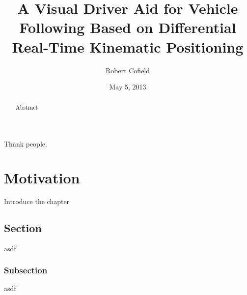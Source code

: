 \documentclass[12pt]{report}
\title{A Visual Driver Aid for Vehicle Following Based on Differential Real-Time Kinematic Positioning}
\author{Robert Cofield}
\date{May 5, 2013}
\begin{document}
\begin{romanpages}

\TitlePage

\begin{abstract}
Abstract
\end{abstract}

\begin{acknowledgments}
Thank people.
\end{acknowledgments}

\tableofcontents
\listoffigures
\listoftables

\printnomenclature[0.5in] 

\end{romanpages}

\normalem       %

\chapter{Motivation}

Introduce the chapter

\section{Section}
asdf

\subsection{Subsection}
asdf


\end{document}
